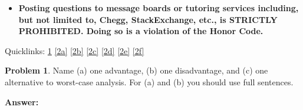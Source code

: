 \documentclass[11pt]{article}
\theoremstyle{definition}
\theoremstyle{definition}
\newtheorem{problem}{Problem}
\theoremstyle{definition}
\begin{document}
\begin{small}
\begin{itemize}
	\item \textbf{Posting questions to message boards or tutoring services including, but not limited to, Chegg, StackExchange, etc., is STRICTLY PROHIBITED. Doing so is a violation of the Honor Code.}
\end{itemize}

Quicklinks: \ref{1} \ref{2a} \ref{2b} \ref{2c} \ref{2d} \ref{2e} \ref{2f}
\vspace{-4mm} 
\end{small}


\hrulefill

\begin{problem}  \label{1}
Name (a) one advantage, (b) one disadvantage, and (c) one alternative to worst-case analysis. For (a) and (b) you should use full sentences.
\end{problem}

\noindent \textbf{Answer:} %

\pagebreak
\end{document}
